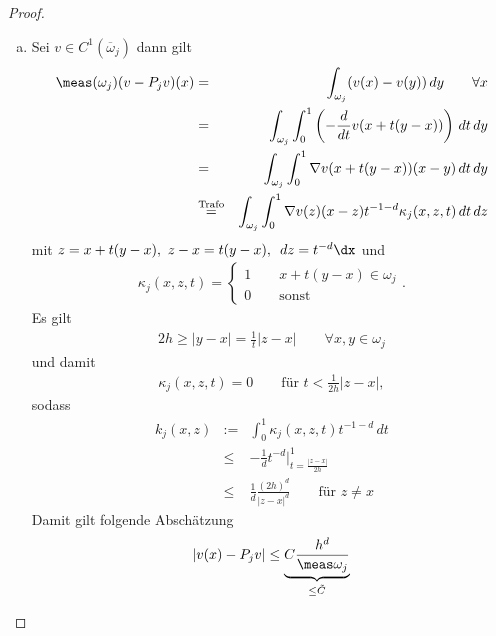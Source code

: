 \begin{proof}
    \begin{enumerate}[a)]
      \item
        Sei $v\in C^1(\overline\omega_j)$ dann gilt
        \begin{eqnarray*}
                \meas(\omega_j)(v - P_jv)(x)
            &=& \int_{\omega_j} (v(x) - v(y)) \,dy
                \qquad \forall x \\
            &=& \int_{\omega_j} \int_0^1 \left(-\frac{d}{dt} v(x + t(y - x))
                \right) \,dt \,dy \\
            &=& \int_{\omega_j} \int_0^1 \nabla v(x + t(y - x)) (x - y) \,dt
                \,dy \\
            &\stackrel{\text{Trafo}}{=}&
                \int_{\omega_j} \int_0^1 \nabla v(z) (x - z) t^{-1-d}
                \kappa_j(x,z,t) \,dt \,dz
        \end{eqnarray*}
        mit $z = x + t(y - x), \ z - x = t(y - x), \ \,dz = t^{-d} \dx$ und
        \begin{eqnarray*}
            \kappa_j(x,z,t) = \begin{cases}
                                  1 \qquad x + t(y - x)\in \omega_j \\
                                  0 \qquad \text{sonst}
                              \end{cases}.
        \end{eqnarray*}
        Es gilt 
        \begin{eqnarray*}
            2h \ge |y - x| = \frac{1}{t} |z - x| \qquad \forall x,y\in \omega_j
        \end{eqnarray*}
        und damit
        \begin{eqnarray*}
            \kappa_j(x,z,t) = 0 \qquad \text{für } t < \frac{1}{2h} |z - x|,
        \end{eqnarray*}
        sodass
        \begin{eqnarray*}
                k_j(x,z)
            &:=& \int_0^1 \kappa_j(x,z,t) t^{-1-d} \,dt \\
            &\le& -\frac{1}{d} t^{-d} \Bigg|_{t = \frac{|z - x|}{2h}}^1 \\
            &\le& \frac{1}{d} \frac{(2h)^d}{|z - x|^d}
                  \qquad \text{für } z \neq x
        \end{eqnarray*}
        Damit gilt folgende Abschätzung
        \begin{eqnarray*}
                |v(x) - P_jv|
            \le \underbrace{C \frac{h^d}{\meas\omega_j}}_{\le \tilde C}

\end{eqnarray*}
\end{enumerate}
\end{proof}
